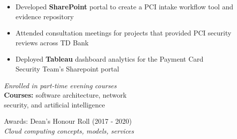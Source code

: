 \documentclass[10pt,a4paper,ragged2e,withhyper]{altacv}
\begin{document}
\begin{paracol}{2}
        \medskip
        
        \begin{itemize}
            \item Developed \textbf{SharePoint} portal to create a PCI intake workflow tool and evidence repository
            \item Attended consultation meetings for projects that provided PCI security reviews across TD Bank
            \item Deployed \textbf{Tableau} dashboard analytics for the Payment Card\\ Security Team's Sharepoint portal
    
        \end{itemize}
        
        \medskip
        
        \newpage
        
        \switchcolumn
        
        
        \textit{Enrolled in part-time evening courses}\\
        \medskip
        \textbf{Courses:} software architecture, network\\ security, and artificial intelligence\\
        
        \divider
        
        Awards: Dean's Honour Roll (2017 - 2020)\\
        
        \medskip
        \textit{Cloud computing concepts, models, services}\\
        \medskip
        

\end{paracol}
\end{document}
